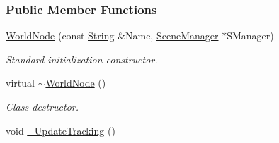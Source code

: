 \subsubsection*{Public Member Functions}
\begin{DoxyCompactItemize}
\item 
\hyperlink{classMezzanine_1_1WorldNode_acb3be02579f07d95d55d040d10cc12a0}{WorldNode} (const \hyperlink{namespaceMezzanine_acf9fcc130e6ebf08e3d8491aebcf1c86}{String} \&Name, \hyperlink{classMezzanine_1_1SceneManager}{SceneManager} $\ast$SManager)
\begin{DoxyCompactList}\small\item\em Standard initialization constructor. \item\end{DoxyCompactList}\item 
\hypertarget{classMezzanine_1_1WorldNode_a7584e9792b3ceb2bd5effc1ddb50c266}{
virtual \hyperlink{classMezzanine_1_1WorldNode_a7584e9792b3ceb2bd5effc1ddb50c266}{$\sim$WorldNode} ()}
\label{classMezzanine_1_1WorldNode_a7584e9792b3ceb2bd5effc1ddb50c266}

\begin{DoxyCompactList}\small\item\em Class destructor. \item\end{DoxyCompactList}\item 
\hypertarget{classMezzanine_1_1WorldNode_a065e8789f8b4b49866d1f7ca3a38d0d0}{
void \hyperlink{classMezzanine_1_1WorldNode_a065e8789f8b4b49866d1f7ca3a38d0d0}{\_\-UpdateTracking} ()}
\label{classMezzanine_1_1WorldNode_a065e8789f8b4b49866d1f7ca3a38d0d0}


\end{DoxyCompactItemize}
